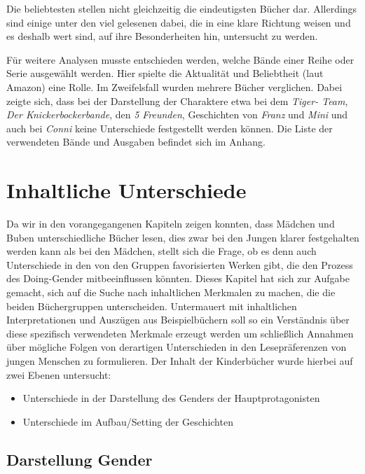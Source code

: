 Die beliebtesten stellen nicht gleichzeitig die eindeutigsten Bücher
dar. Allerdings sind einige unter den viel gelesenen dabei, die in eine
klare Richtung weisen und es deshalb wert sind, auf ihre Besonderheiten
hin, untersucht zu werden.

Für weitere Analysen musste entschieden werden, welche Bände einer Reihe
oder Serie ausgewählt werden. Hier spielte die Aktualität und
Beliebtheit (laut Amazon) eine Rolle. Im Zweifelsfall wurden mehrere
Bücher verglichen. Dabei zeigte sich, dass bei der Darstellung der
Charaktere etwa bei dem \emph{Tiger- Team}, \emph{Der
Knickerbockerbande}, den \emph{5 Freunden}, Geschichten von \emph{Franz}
und \emph{Mini} und auch bei \emph{Conni} keine Unterschiede
festgestellt werden können. Die Liste der verwendeten Bände und Ausgaben
befindet sich im Anhang.

\chapter{Inhaltliche Unterschiede}

Da wir in den vorangegangenen Kapiteln zeigen konnten, dass Mädchen und
Buben unterschiedliche Bücher lesen, dies zwar bei den Jungen klarer
festgehalten werden kann als bei den Mädchen, stellt sich die Frage, ob
es denn auch Unterschiede in den von den Gruppen favorisierten Werken
gibt, die den Prozess des Doing-Gender mitbeeinflussen könnten. Dieses
Kapitel hat sich zur Aufgabe gemacht, sich auf die Suche nach
inhaltlichen Merkmalen zu machen, die die beiden Büchergruppen
unterscheiden. Untermauert mit inhaltlichen Interpretationen und
Auszügen aus Beispielbüchern soll so ein Verständnis über diese
spezifisch verwendeten Merkmale erzeugt werden um schließlich Annahmen
über mögliche Folgen von derartigen Unterschieden in den Lesepräferenzen
von jungen Menschen zu formulieren. Der Inhalt der Kinderbücher wurde
hierbei auf zwei Ebenen untersucht:

\begin{itemize}
\item
  Unterschiede in der Darstellung des Genders der Hauptprotagonisten
\item
  Unterschiede im Aufbau/Setting der Geschichten
\end{itemize}

\section{Darstellung Gender}

